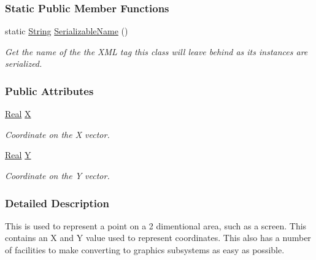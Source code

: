 \subsubsection*{Static Public Member Functions}
\begin{DoxyCompactItemize}
\item 
static \hyperlink{namespaceMezzanine_acf9fcc130e6ebf08e3d8491aebcf1c86}{String} \hyperlink{classMezzanine_1_1Vector2_aae9e37b9741b05e27752f9ca44bdf382}{SerializableName} ()
\begin{DoxyCompactList}\small\item\em Get the name of the the XML tag this class will leave behind as its instances are serialized. \item\end{DoxyCompactList}\end{DoxyCompactItemize}
\subsubsection*{Public Attributes}
\begin{DoxyCompactItemize}
\item 
\hypertarget{classMezzanine_1_1Vector2_a204bb23ce90f944f342fe86203f539d1}{
\hyperlink{namespaceMezzanine_a726731b1a7df72bf3583e4a97282c6f6}{Real} \hyperlink{classMezzanine_1_1Vector2_a204bb23ce90f944f342fe86203f539d1}{X}}
\label{classMezzanine_1_1Vector2_a204bb23ce90f944f342fe86203f539d1}

\begin{DoxyCompactList}\small\item\em Coordinate on the X vector. \item\end{DoxyCompactList}\item 
\hypertarget{classMezzanine_1_1Vector2_aa189e2585580d3f82b29584844fad0ad}{
\hyperlink{namespaceMezzanine_a726731b1a7df72bf3583e4a97282c6f6}{Real} \hyperlink{classMezzanine_1_1Vector2_aa189e2585580d3f82b29584844fad0ad}{Y}}
\label{classMezzanine_1_1Vector2_aa189e2585580d3f82b29584844fad0ad}

\begin{DoxyCompactList}\small\item\em Coordinate on the Y vector. \item\end{DoxyCompactList}\end{DoxyCompactItemize}


\subsubsection{Detailed Description}
This is used to represent a point on a 2 dimentional area, such as a screen. This contains an X and Y value used to represent coordinates. This also has a number of facilities to make converting to graphics subsystems as easy as possible. 

